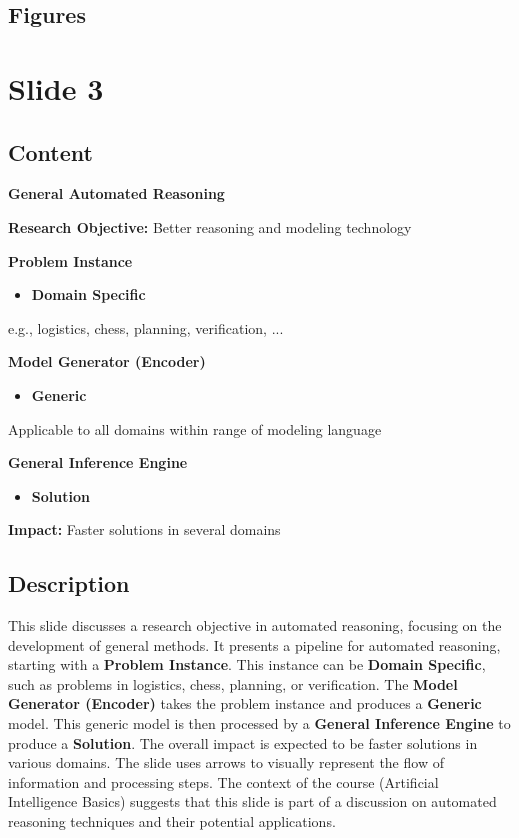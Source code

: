 \documentclass{article}%
\begin{document}
\subsection{Figures}%
\begin{figure}[H]%
\centering%
\end{figure}

%
\newpage%
\section{Slide 3}%
\label{sec:Slide3}%
\subsection{Content}%

\textbf{General Automated Reasoning}

\textbf{Research Objective:} Better reasoning and modeling technology

\textbf{Problem Instance} \quad \begin{itemize}
\item[$\rightarrow$] \textbf{Domain Specific}
\end{itemize}
\quad e.g., logistics, chess, planning, verification, ...

\textbf{Model Generator (Encoder)} \quad \begin{itemize}
\item[$\rightarrow$] \textbf{Generic}
\end{itemize}
\quad Applicable to all domains within range of modeling language

\textbf{General Inference Engine} \quad \begin{itemize}
\item[$\rightarrow$] \textbf{Solution}
\end{itemize}

\textbf{Impact:} Faster solutions in several domains
%
\subsection{Description}%
This slide discusses a research objective in automated reasoning, focusing on the development of general methods.  It presents a pipeline for automated reasoning, starting with a \textbf{Problem Instance}.  This instance can be \textbf{Domain Specific}, such as problems in logistics, chess, planning, or verification.  The \textbf{Model Generator (Encoder)} takes the problem instance and produces a \textbf{Generic} model.  This generic model is then processed by a \textbf{General Inference Engine} to produce a \textbf{Solution}.  The overall impact is expected to be faster solutions in various domains.  The slide uses arrows to visually represent the flow of information and processing steps.  The context of the course (Artificial Intelligence Basics) suggests that this slide is part of a discussion on automated reasoning techniques and their potential applications.%
\end{document}
